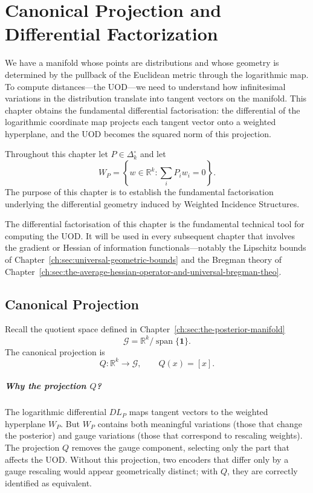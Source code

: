 \chapter[Canonical Projection]{Canonical Projection and Differential Factorization}\label{ch:sec:canonical-projection-and-differential-factorisation}

We have a manifold whose points are distributions and whose geometry is
determined by the pullback of the Euclidean metric through the
logarithmic map.  To compute distances---the UOD---we need to understand
how infinitesimal variations in the distribution translate into
tangent vectors on the manifold.  This chapter obtains the fundamental
differential factorisation: the differential of the logarithmic
coordinate map projects each tangent vector onto a weighted hyperplane,
and the UOD becomes the squared norm of this projection.

Throughout this chapter let
$P\in\Delta_k^\circ$
and let
\[
W_P=
\left\{
w\in\mathbb R^k:
\sum_i P_i w_i=0
\right\}.
\]
The purpose of this chapter is to establish the fundamental factorisation underlying the differential geometry induced by Weighted Incidence Structures.

The differential factorisation of this chapter is the fundamental technical tool for computing the UOD. It will be used in every subsequent chapter that involves the gradient or Hessian of information functionals---notably the Lipschitz bounds of Chapter~\ref{ch:sec:universal-geometric-bounds} and the Bregman theory of Chapter~\ref{ch:sec:the-average-hessian-operator-and-universal-bregman-theo}.

\section{Canonical Projection}\label{ch:sec:canonical-projection-projection}
Recall the quotient space defined in Chapter~\ref{ch:sec:the-posterior-manifold}
\[
\mathcal G
=
\mathbb R^k
/
\operatorname{span}\{\mathbf1\}.
\]
The canonical projection is
\[
Q:\mathbb R^k
\longrightarrow
\mathcal G,
\qquad
Q(x)=[x].
\]

\paragraph{Why the projection $Q$?}
The logarithmic differential $DL_P$ maps tangent vectors to the weighted hyperplane $W_P$.
But $W_P$ contains both meaningful variations (those that change the posterior) and gauge variations (those that correspond to rescaling weights).
The projection $Q$ removes the gauge component, selecting only the part that affects the UOD.
Without this projection, two encoders that differ only by a gauge rescaling would appear geometrically distinct; with $Q$, they are correctly identified as equivalent.

